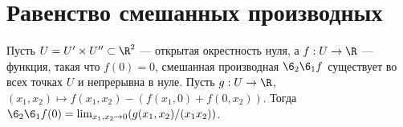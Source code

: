 \documentclass[
	extrafontsizes,
	11pt,
	hyphens,
]{memoir}
\begin{document}
%
%
%


\section{Равенство смешанных производных}

\begin{theorem}
Пусть \(U = U' \times U'' \subset \R^2\) --- открытая окрестность нуля, а \(f : U \to \R\) --- функция, такая что
\(f(0) = 0\),
смешанная производная
\(\6_2 \6_1 f\)
существует во всех точках \(U\) и непрерывна в нуле.
Пусть \(g : U \to \R\), \((x_1,x_2) \mapsto f(x_1,x_2) - (f(x_1,0) + f(0,x_2))\).
Тогда
\(
\6_2 \6_1 f(0) =
\lim_{x_1,x_2 \to 0} (g(x_1,x_2)/(x_1 x_2))
\).
\end{theorem}
\end{document}
